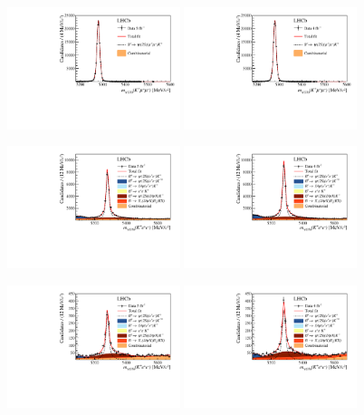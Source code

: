\begin{figure}
    \centering
    \includegraphics[width=0.45\textwidth]{figures/FigS2a.pdf}
    \includegraphics[width=0.45\textwidth]{figures/FigS2b.pdf}
    
    \includegraphics[width=0.45\textwidth]{figures/FigS2c.pdf}
    \includegraphics[width=0.45\textwidth]{figures/FigS2d.pdf}
    
    \includegraphics[width=0.45\textwidth]{figures/FigS2e.pdf}
    \includegraphics[width=0.45\textwidth]{figures/FigS2f.pdf}
    

\end{figure}
